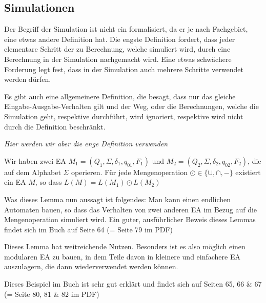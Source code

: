 \newpage
\subsection{Simulationen}
Der Begriff der Simulation ist nicht ein formalisiert, da er je nach Fachgebiet, eine etwas andere Definition hat.
Die engste Definition fordert, dass jeder elementare Schritt der zu Berechnung, welche simuliert wird, durch eine Berechnung in der Simulation nachgemacht wird.
Eine etwas schwächere Forderung legt fest, dass in der Simulation auch mehrere Schritte verwendet werden dürfen.

Es gibt auch eine allgemeinere Definition, die besagt, dass nur das gleiche Eingabe-Ausgabe-Verhalten gilt und der Weg, oder die Berechnungen, welche die Simulation geht, respektive durchführt, wird ignoriert, respektive wird nicht durch die Definition beschränkt.

\textit{Hier werden wir aber die enge Definition verwenden}

\inlinelemma Wir haben zwei EA $M_1 = (Q_1, \Sigma, \delta_1, q_{01}, F_1)$ und $M_2 = (Q_2, \Sigma, \delta_2, q_{02}, F_2)$, die auf dem Alphabet $\Sigma$ operieren.
Für jede Mengenoperation $\odot \in \{ \cup, \cap, - \}$ existiert ein EA $M$, so dass $L(M) = L(M_1) \odot L(M_2)$

Was dieses Lemma nun aussagt ist folgendes: Man kann einen endlichen Automaten bauen, so dass das Verhalten von zwei anderen EA im Bezug auf die Mengenoperation simuliert wird.
Ein guter, ausführlicher Beweis dieses Lemmas findet sich im Buch auf Seite 64 (= Seite 79 im PDF)

Dieses Lemma hat weitreichende Nutzen. Besonders ist es also möglich einen modularen EA zu bauen, in dem Teile davon in kleinere und einfachere EA auszulagern, die dann wiederverwendet werden können.

\inlineex Dieses Beispiel im Buch ist sehr gut erklärt und findet sich auf Seiten 65, 66 \& 67 (= Seite 80, 81 \& 82 im PDF)

